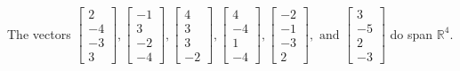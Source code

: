 \begin{exercise}
\begin{exerciseStatement}
  \end{exerciseStatement}
  \begin{exerciseAnswer}
   The vectors \(\left[\begin{array}{r}
2 \\
-4 \\
-3 \\
3
\end{array}\right] , \left[\begin{array}{r}
-1 \\
3 \\
-2 \\
-4
\end{array}\right] , \left[\begin{array}{r}
4 \\
3 \\
3 \\
-2
\end{array}\right] , \left[\begin{array}{r}
4 \\
-4 \\
1 \\
-4
\end{array}\right] , \left[\begin{array}{r}
-2 \\
-1 \\
-3 \\
2
\end{array}\right] , \text{ and } \left[\begin{array}{r}
3 \\
-5 \\
2 \\
-3
\end{array}\right]\) 
  	 do  
	span \(\mathbb{R}^4\).
  


  \end{exerciseAnswer}
\end{exercise}
